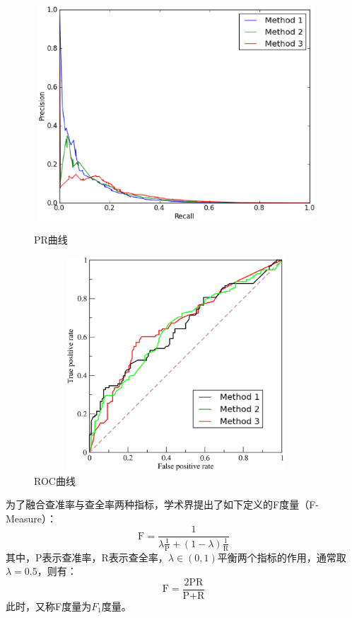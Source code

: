 \begin{figure}[ht]
    \begin{minipage}[t]{0.49\linewidth}
        \centering
        \includegraphics[width=0.95\textwidth, height = 8cm]{figures/prcurve.eps}
        \caption{PR曲线}\label{fig:prcurve}
    \end{minipage}
    \begin{minipage}[t]{0.49\linewidth}
        \centering
        \includegraphics[width = 0.95\textwidth, height = 8cm]{figures/roccurve.eps}
        \caption{ROC曲线}\label{fig:roccurve}
    \end{minipage}
\end{figure}

为了融合查准率与查全率两种指标，学术界提出了如下定义的F度量（F-Measure）：
\begin{equation}\label{eq:fmeasure}
  \text{F} = \frac{1}{\lambda\frac{1}{\text{P}} + (1-\lambda)\frac{1}{\text{R}}}
\end{equation}
其中，P表示查准率，R表示查全率，$\lambda \in (0,1)$平衡两个指标的作用，通常取$\lambda=0.5$，则有：
\begin{equation}\label{eq:0.5fmeasure}
  \text{F} = \frac{2\text{PR}}{\text{P+R}}
\end{equation}
此时，又称F度量为$F_1$度量。

